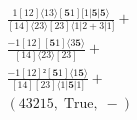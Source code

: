 \documentclass[varwidth, border=5pt]{standalone}
\begin{document}
\begin{my}
$\begin{gathered}
\scriptscriptstyle\frac{1[12]⟨13⟩[𝟓1][1|𝟓|𝟓⟩}{[14]⟨23⟩[23]⟨1|2+3|1]} +\\
\scriptscriptstyle\frac{-1[12][𝟓1]⟨3𝟓⟩}{[14]⟨23⟩[23]} +\\
\scriptscriptstyle\frac{-1[12]²[𝟓1]⟨1𝟓⟩}{[14][23]⟨1|𝟓|1]} +\\
\scriptscriptstyle(43215,\;\text{True},\;-) \phantom{+}
\end{gathered}$
\end{my}
\end{document}
